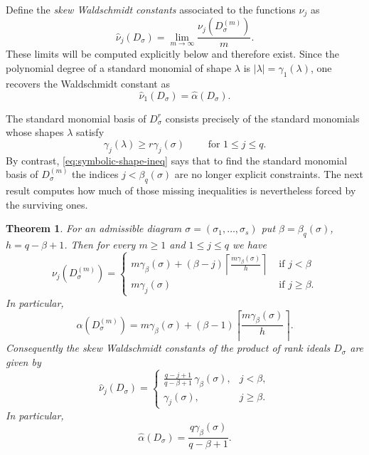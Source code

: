 \documentclass[11pt,reqno]{amsart}
\numberwithin{equation}{subsection}
\newtheorem{theorem}[equation]{Theorem}
\theoremstyle{definition}
\theoremstyle{remark}
\begin{document}
Define the {\em skew Waldschmidt constants} associated to the functions $\nu_j$ as
\[
 \widehat\nu_j(D_\sigma)
 =\lim_{m\to\infty}\frac{\nu_j(D_\sigma^{(m)})}{m}.
\]
These limits will be computed explicitly below and therefore exist.
Since the polynomial degree of a standard monomial of shape $\lambda$
is $|\lambda|=\gamma_1(\lambda)$, one recovers the Waldschmidt constant as
\[
\widehat\nu_1(D_\sigma)=\widehat\alpha(D_\sigma).
\]

The standard monomial basis of $D_\sigma^r$ consists precisely
of the standard monomials whose shapes $\lambda$ satisfy
\[
\gamma_j(\lambda)\ge r\gamma_j(\sigma)
\qquad \text{ for }1\le j\le q.
\]
By contrast, \eqref{eq:symbolic-shape-ineq}  says that to find the standard monomial basis of $D_\sigma^{(m)}$  the indices $j<\beta_q(\sigma)$ are no longer explicit constraints. The next result computes how much of those missing inequalities is nevertheless forced by the surviving ones.



\begin{theorem}\label{thm:waldschmidt}
For an admissible diagram $\sigma=(\sigma_1, \ldots, \sigma_s)$ put $\beta=\beta_q(\sigma)$, $h=q-\beta+1$.
Then  for every $m\geq 1$ and  $1\le j\le q$ we have 
\begin{equation}\label{eq:exact-skew}
\nu_j(D_\sigma^{(m)})=\begin{cases}
m\gamma_\beta(\sigma)+(\beta-j)\left \lceil \frac{m\gamma_\beta(\sigma)}{h}\right \rceil & \text{ if } j<\beta\\
m\gamma_j(\sigma) & \text{ if } j \geq \beta.
\end{cases}
\end{equation}
In particular,
\begin{equation}\label{eq:exact-alpha}
\alpha(D_\sigma^{(m)})=m\gamma_\beta(\sigma)+(\beta-1)\left \lceil \frac{m\gamma_\beta(\sigma)}{h} \right \rceil.
\end{equation}
Consequently the
skew Waldschmidt constants of the product of rank ideals $D_\sigma$ are given by
\begin{equation}\label{eq:all-orders}
 \widehat\nu_j(D_\sigma)=
 \begin{cases}
 \displaystyle
 \frac{q-j+1}{q-\beta+1}\,\gamma_\beta(\sigma),&j<\beta,\\[8pt]
 \gamma_j(\sigma),&j\ge\beta.
 \end{cases}
\end{equation}
In particular,
\begin{equation}\label{eq:waldschmidt}
 \widehat\alpha(D_\sigma)
 =\frac{q\gamma_\beta(\sigma)}{q-\beta+1}.
\end{equation}
\end{theorem}
\end{document}
